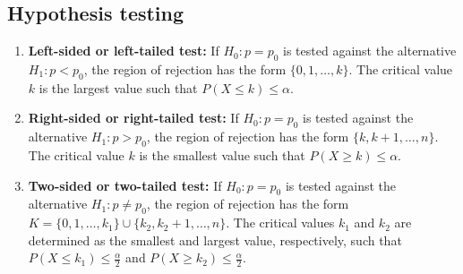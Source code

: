 \subsection{Hypothesis testing}
\begin{enumerate}
  \item \textbf{Left-sided or left-tailed test: } If $H_0 : p = p_0$ is tested against the alternative $H_1 : p < p_0$, the region of rejection has the form $\{0, 1, \ldots, k\}$. The critical value $k$ is the largest value such that $P(X \leq k) \leq \alpha$.
  \item \textbf{Right-sided or right-tailed test: } If \(H_0 : p = p_0\) is tested against the alternative \(H_1 : p > p_0\), the region of rejection has the form \(\{k, k + 1, \ldots , n\}\). The critical value \(k\) is the smallest value such that \(P(X \geq k) \leq \alpha\).
  \item \textbf{Two-sided or two-tailed test: } If \(H_0 : p = p_0\) is tested against the alternative \(H_1 : p \neq p_0\), the region of rejection has the form \(K = \{0, 1, \ldots , k_1\} \cup \{k_2, k_2+1, \ldots , n\}\). The critical values \(k_1\) and \(k_2\) are determined as the smallest and largest value, respectively, such that \(P(X \leq k_1) \leq \frac{\alpha}{2}\) and \(P(X \geq k_2) \leq \frac{\alpha}{2}\).

\end{enumerate}

\BoxStart{}
